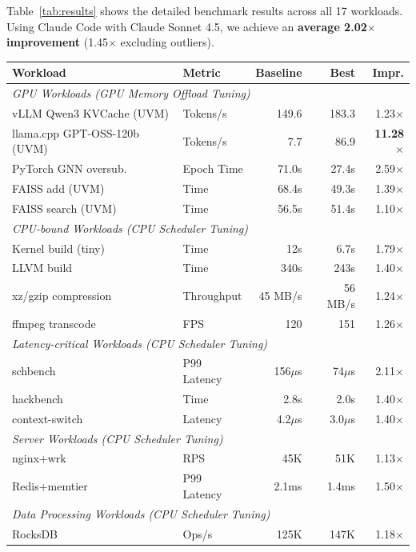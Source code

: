 \documentclass{article}
\begin{document}
Table~\ref{tab:results} shows the detailed benchmark results across all 17 workloads. Using Claude Code with Claude Sonnet 4.5, we achieve an \textbf{average 2.02$\times$ improvement} (1.45$\times$ excluding outliers).

\begin{table}[h]
\centering
\small
\begin{tabular}{llrrr}
\toprule
\textbf{Workload} & \textbf{Metric} & \textbf{Baseline} & \textbf{Best} & \textbf{Impr.} \\
\midrule
\multicolumn{5}{l}{\textit{GPU Workloads (GPU Memory Offload Tuning)}} \\
vLLM Qwen3 KVCache (UVM) & Tokens/s & 149.6 & 183.3 & 1.23$\times$ \\
llama.cpp GPT-OSS-120b (UVM) & Tokens/s & 7.7 & 86.9 & \textbf{11.28$\times$} \\
PyTorch GNN oversub. & Epoch Time & 71.0s & 27.4s & 2.59$\times$ \\
FAISS add (UVM) & Time & 68.4s & 49.3s & 1.39$\times$ \\
FAISS search (UVM) & Time & 56.5s & 51.4s & 1.10$\times$ \\
\midrule
\multicolumn{5}{l}{\textit{CPU-bound Workloads (CPU Scheduler Tuning)}} \\
Kernel build (tiny) & Time & 12s & 6.7s & 1.79$\times$ \\
LLVM build & Time & 340s & 243s & 1.40$\times$ \\
xz/gzip compression & Throughput & 45 MB/s & 56 MB/s & 1.24$\times$ \\
ffmpeg transcode & FPS & 120 & 151 & 1.26$\times$ \\
\midrule
\multicolumn{5}{l}{\textit{Latency-critical Workloads (CPU Scheduler Tuning)}} \\
schbench & P99 Latency & 156$\mu$s & 74$\mu$s & 2.11$\times$ \\
hackbench & Time & 2.8s & 2.0s & 1.40$\times$ \\
context-switch & Latency & 4.2$\mu$s & 3.0$\mu$s & 1.40$\times$ \\
\midrule
\multicolumn{5}{l}{\textit{Server Workloads (CPU Scheduler Tuning)}} \\
nginx+wrk & RPS & 45K & 51K & 1.13$\times$ \\
Redis+memtier & P99 Latency & 2.1ms & 1.4ms & 1.50$\times$ \\
\midrule
\multicolumn{5}{l}{\textit{Data Processing Workloads (CPU Scheduler Tuning)}} \\
RocksDB & Ops/s & 125K & 147K & 1.18$\times$ \\

\end{tabular}
\end{table}
\end{document}
